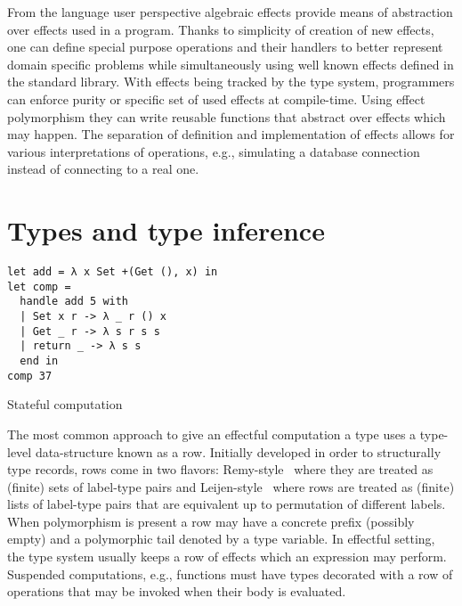 \documentclass[inz, english, longabstract]{iithesis}
\begin{document}
From the language user perspective algebraic effects provide means of abstraction over effects used in a program.
Thanks to simplicity of creation of new effects, one can define special purpose operations and their handlers to better represent domain specific problems while simultaneously using well known effects defined in the standard library.
With effects being tracked by the type system, programmers can enforce purity or specific set of used effects at compile-time.
Using effect polymorphism they can write reusable functions that abstract over effects which may happen.
The separation of definition and implementation of effects allows for various interpretations of operations, e.g., simulating a database connection instead of connecting to a real one.

\section{Types and type inference}\label{sec:types}
\begin{listing}[t]
  \begin{verbatim}
let add = λ x Set +(Get (), x) in
let comp = 
  handle add 5 with
  | Set x r -> λ _ r () x
  | Get _ r -> λ s r s s
  | return _ -> λ s s
  end in
comp 37
  \end{verbatim}
  \caption{Stateful computation}
  \label{lst:stateful-computation}
\end{listing}
The most common approach to give an effectful computation a type uses a type-level data-structure known as a row.
Initially developed in order to structurally type records, rows come in two flavors: Remy-style~\cite{Remy1994} where they are treated as (finite) sets of label-type pairs and Leijen-style~\cite{Leijen2005} where rows are treated as (finite) lists of label-type pairs that are equivalent up to permutation of different labels.
When polymorphism is present a row may have a concrete prefix (possibly empty) and a polymorphic tail denoted by a type variable.
In effectful setting, the type system usually keeps a row of effects which an expression may perform.
Suspended computations, e.g., functions must have types decorated with a row of operations that may be invoked when their body is evaluated.
\end{document}
